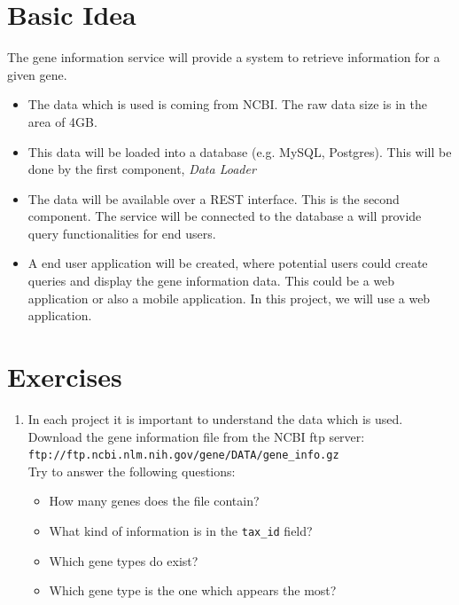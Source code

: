 \section{Basic Idea}
The gene information service will provide a system to retrieve
information for a given gene.
\begin{itemize}
\item The data which is used is coming from NCBI. The raw data size
is in the area of 4GB.
\item This data will be loaded into a database (e.g. MySQL, Postgres).
This will be done by the first component, \emph{Data Loader}
\item The data will be available over a REST interface. This is
the second component. The service will be connected to the database
a will provide query functionalities for end users.
\item A end user application will be created, where potential
users could create queries and display the gene information data.
This could be a web application or also a mobile application. In this
project, we will use a web application.
\end{itemize}

\section{Exercises}
\begin{enumerate}
\item In each project it is important to understand the data which
is used. Download the gene information file from the NCBI ftp server:\\
\vspace{3mm}
\verb|ftp://ftp.ncbi.nlm.nih.gov/gene/DATA/gene_info.gz|\\
\vspace{3mm}
Try to answer the following questions:
\begin{itemize}
\item How many genes does the file contain?
\item What kind of information is in the \verb|tax_id| field?
\item Which gene types do exist?
\item Which gene type is the one which appears the most?
\end{itemize}

\end{enumerate}
